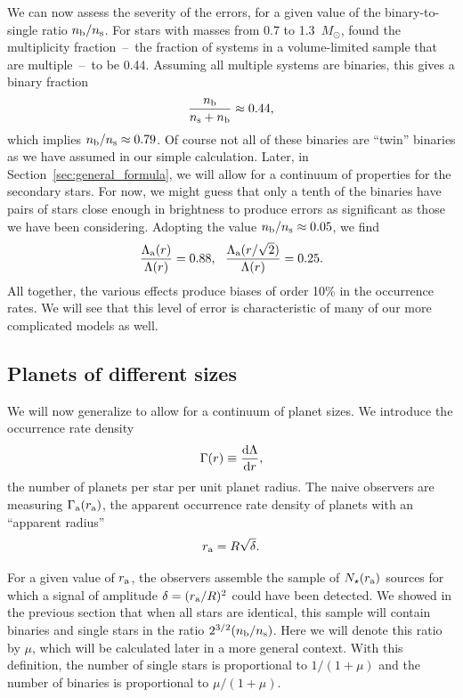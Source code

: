 \documentclass[12pt,modern]{aastex61}
\renewcommand{\a}{_{\rm a}}
\newcommand{\s}{_{\rm s}}
\renewcommand{\b}{_{\rm b}}
\begin{document}
We can now assess the severity of the errors, for a given value of the
binary-to-single ratio $n\b/n\s$. For stars with masses from 0.7 to
1.3~$M_\odot$, \citet{raghavan_survey_2010} found the multiplicity
fraction~--~the fraction of systems in a volume-limited sample that
are multiple~--~to be 0.44.  Assuming all multiple systems are
binaries, this gives a binary fraction
\begin{equation}
  \frac{n\b}{n\s + n\b} \approx 0.44,
\end{equation}
which implies $n\b/n\s \approx 0.79$.  Of course not all of
these binaries are ``twin'' binaries as we have assumed in our simple
calculation.  Later, in Section~\ref{sec:general_formula}, we will
allow for a continuum of properties for the secondary stars. For now,
we might guess that only a tenth of the binaries have pairs of stars
close enough in brightness to produce errors as significant as those
we have been considering.  Adopting the value $n\b/n\s\approx0.05$, we
find
\begin{equation}
    \frac{\Lambda\a(r)}{\Lambda(r)} = 0.88,~~
    \frac{\Lambda\a(r/\sqrt{2})}{\Lambda(r)} = 0.25.
    \label{eq:ratios}
\end{equation}
All together, the various effects produce biases of order 10\% in the
occurrence rates.  We will see that this level of error is
characteristic of many of our more complicated models as well.

\subsection{Planets of different sizes}
\label{sec:model_1_density}

We will now generalize to allow for a continuum of planet sizes.   We
introduce the occurrence rate density
\begin{equation}
    \Gamma(r) \equiv \frac{{\rm d}\Lambda}{{\rm d}r},
    \label{eq:rate_density_defn}
\end{equation}
the number of planets per star per unit planet radius.  The naive
observers are measuring $\Gamma\a(r\a)$, the apparent occurrence rate
density of planets with an ``apparent radius''
\begin{equation}
  r\a = R \sqrt{\delta}.
\end{equation}

For a given value of $r\a$, the observers assemble the sample of
$N_\star(r\a)$ sources for which a signal of amplitude $\delta =
(r\a/R)^2$ could have been detected.  We showed in the previous
section that when all stars are identical, this sample will contain
binaries and single stars in the ratio $2^{3/2}(n\b/n\s)$.  Here we
will denote this ratio by $\mu$, which will be calculated later in a
more general context.  With this definition, the number of single
stars is proportional to $1/(1+\mu)$ and the number of binaries is
proportional to $\mu/(1+\mu)$.
\end{document}
